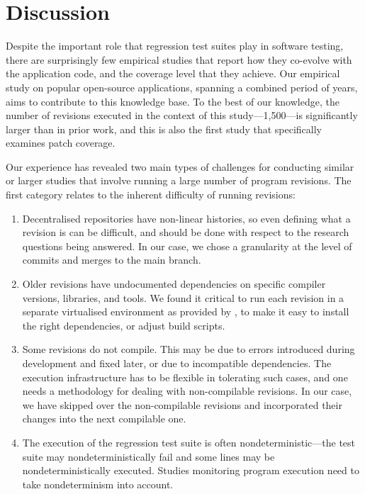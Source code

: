 \section{Discussion}
\label{evolution:discussion}

Despite the important role that regression test suites play in
software testing, there are surprisingly few empirical studies that
report how they co-evolve with the application code, and the coverage
level that they achieve.  Our empirical study on \numSystems popular
open-source applications, spanning a combined period of \numYears
years, aims to contribute to this knowledge base.  To the best of our
knowledge, the number of revisions executed in the context of
this study---1,500---is significantly larger than in prior work, and
this is also the first study that specifically examines patch
coverage.

Our experience has revealed two main types of challenges for
conducting similar or larger studies that involve running a large
number of program revisions.  The first category relates to the
inherent difficulty of running revisions:

\begin{enumerate}
\item Decentralised repositories have non-linear histories, so even
  defining what a revision is can be difficult, and should be done
  with respect to the research questions being answered.  In our case,
  we chose a granularity at the level of commits and merges to the
  main branch.

\item Older revisions have undocumented dependencies on specific
  compiler versions, libraries, and tools.  We found it critical to
  run each revision in a separate virtualised environment as provided
  by \covrig, to make it easy to install the right dependencies, or
  adjust build scripts.

\item Some revisions do not compile.  This may be due to errors
  introduced during development and fixed later, or due to incompatible
  dependencies.  The execution infrastructure has to be
  flexible in tolerating such cases, and one needs a methodology for
  dealing with non-compilable revisions.  In our case, we have skipped
  over the non-compilable revisions and incorporated their changes into
  the next compilable one.

\item The execution of the regression test suite is often
  nondeterministic---the test suite may nondeterministically fail
  and some lines may be nondeterministically executed.  Studies
  monitoring program execution need to take nondeterminism
  into account.
\end{enumerate}

